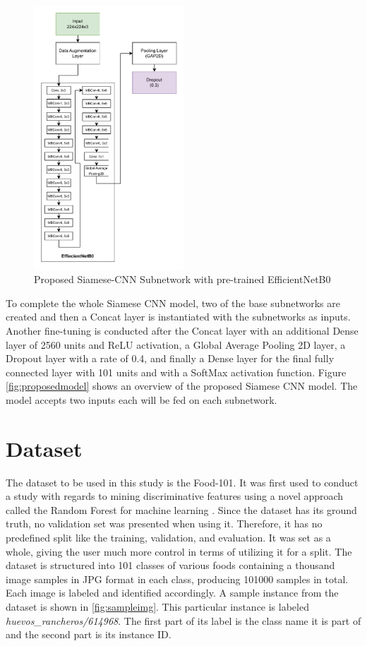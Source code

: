 \begin{figure}[h]
	\centering
	\includegraphics[width=0.5\textwidth]{graphics/images/Proposed-SCNN-Subnetwork.pdf}
	\caption{Proposed Siamese-CNN Subnetwork with pre-trained EfficientNetB0}
	\label{fig:pscnnsn}
\end{figure}

To complete the whole Siamese CNN model, two of the base subnetworks are created and then a Concat layer is instantiated with the subnetworks as inputs. Another fine-tuning is conducted after the Concat layer with an additional Dense layer of 2560 units and ReLU activation, a Global Average Pooling 2D layer, a Dropout layer with a rate of 0.4, and finally a Dense layer for the final fully connected layer with 101 units and with a SoftMax activation function. Figure \ref{fig:proposedmodel} shows an overview of the proposed Siamese CNN model. The model accepts two inputs each will be fed on each subnetwork.

\section{Dataset}
The dataset to be used in this study is the Food-101\cite{bossard-2014}. It was first used to conduct a study with regards to mining discriminative features using a novel approach called the Random Forest for machine learning \cite{bossard-2014}. Since the dataset has its ground truth, no validation set was presented when using it. Therefore, it has no predefined split like the training, validation, and evaluation. It was set as a whole, giving the user much more control in terms of utilizing it for a split. The dataset is structured into 101 classes of various foods containing a thousand image samples in JPG format in each class, producing 101000 samples in total. Each image is labeled and identified accordingly. A sample instance from the dataset is shown in \ref{fig:sampleimg}. This particular instance is labeled \textit{huevos\_rancheros/614968}. The first part of its label is the class name it is part of and the second part is its instance ID.

